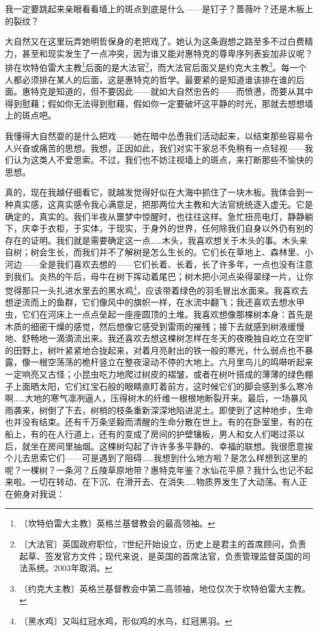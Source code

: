 \documentclass[12pt,UTF-8,openany]{ctexbook}
\begin{document}
\begin{normalsize}
    我一定要跳起来亲眼看看墙上的斑点到底是什么——是钉子？蔷薇叶？还是木板上的裂纹？
    
    大自然又在这里玩弄她明哲保身的老把戏了。她认为这条遐想之路至多不过白费精力，甚至和现实发生了一点冲突，因为谁又能对惠特克的尊卑序列表妄加非议呢？排在坎特伯雷大主教\footnote{〔坎特伯雷大主教〕英格兰基督教会的最高领袖。}后面的是大法官\footnote{〔大法官〕英国政府职位，7世纪开始设立，历史上是君主的首席顾问，负责起草、签发官方文件；现代来说，是英国的首席法官，负责管理监督英国的司法系统。2003年取消。}，而大法官后面又是约克大主教\footnote{〔约克大主教〕英格兰基督教会中第二高领袖，地位仅次于坎特伯雷大主教。}。每一个人都必须排在某人的后面，这是惠特克的哲学。最要紧的是知道谁该排在谁的后面。惠特克是知道的，但不要因此——就如大自然忠告的——而愤懑，而要从其中得到慰藉；假如你无法得到慰藉，假如你一定要破坏这平静的时光，那就去想想墙上的斑点吧。
    
    我懂得大自然耍的是什么把戏——她在暗中怂恿我们活动起来，以结束那些容易令人兴奋或痛苦的思想。我想，正因如此，我们对实干家总不免稍有一点轻视——我们认为这类人不爱思索。不过，我们也不妨注视墙上的斑点，来打断那些不愉快的思想。
    
    真的，现在我越仔细看它，就越发觉得好似在大海中抓住了一块木板。我体会到一种真实感，这真实感令我心满意足，把那两位大主教和大法官统统逐入虚无。它是确定的，真实的。我们半夜从噩梦中惊醒时，也往往这样。急忙扭亮电灯，静静躺下，庆幸于衣柜，于实体，于现实，于身外的世界，任何除我们自身以外仍有别的存在的证明。我们就是需要确定这一点……木头，我喜欢想关于木头的事。木头来自树；树会生长，而我们并不了解树是怎么生长的。它们长在草地上、森林里、小河边——全是我们喜欢去想的——它们长着、长着，长了许多年，一点也没有注意到我们。炎热的午后，母牛在树下挥动着尾巴；树木把小河点染得翠绿一片，让你觉得那只一头扎进水里去的黑水鸡\footnote{〔黑水鸡〕又叫红冠水鸡，形似鸡的水鸟，红冠黑羽。}，应该带着绿色的羽毛冒出水面来。我喜欢去想逆流而上的鱼群，它们像风中的旗帜一样，在水流中翻飞；我还喜欢去想水甲虫，它们在河床上一点点垒起一座座圆顶的土堆。我喜欢想像那棵树本身：首先是木质的细密干燥的感觉，然后想像它感受到雷雨的摧残；接下去就感到树液缓慢地、舒畅地一滴滴流出来。我还喜欢去想这棵树怎样在冬天的夜晚独自屹立在空旷的田野上，树叶紧紧地合拢起来，对着月亮射出的铁一般的寒光，什么弱点也不暴露，像一根空荡荡的桅杆竖立在整夜滚动不停的大地上。六月里鸟儿的鸣啭听起来一定响亮又古怪；小昆虫吃力地爬过树皮的褶皱，或者在树叶搭成的薄薄的绿色棚子上面晒太阳，它们红宝石般的眼睛直盯着前方，这时候它们的脚会感到多么寒冷啊……大地的寒气凛冽逼人，压得树木的纤维一根根地断裂开来。最后，一场暴风雨袭来，树倒了下去，树梢的枝条重新深深地陷进泥土。即使到了这种地步，生命也并没有结束。还有千万条坚毅而清醒的生命分散在世上。有的在卧室里，有的在船上，有的在人行道上，还有的变成了房间的护壁镶板，男人和女人们喝过茶以后，就坐在房间里抽烟。这棵树勾起了许许多多平静的、幸福的联想。我很愿意挨个儿去思索它们——可是遇到了阻碍……我想到什么地方啦？是怎么样想到这里的呢？一棵树？一条河？丘陵草原地带？惠特克年鉴？水仙花平原？我什么也记不起来啦。一切在转动、在下沉、在滑开去、在消失……物质界发生了大动荡。有人正在俯身对我说：
    

\end{normalsize}
\end{document}
